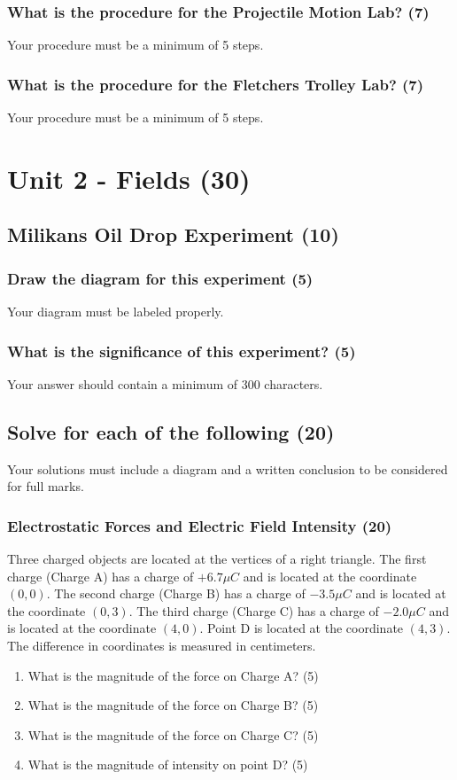 \documentclass{article}
\begin{document}
\subsubsection{What is the procedure for the Projectile Motion Lab? (7)}
Your procedure must be a minimum of 5 steps.
\subsubsection{What is the procedure for the Fletchers Trolley Lab? (7)}
Your procedure must be a minimum of 5 steps.\\

\section{Unit 2 - Fields (30)}
\subsection{Milikans Oil Drop Experiment (10)}
\subsubsection{Draw the diagram for this experiment (5)}
Your diagram must be labeled properly.

\subsubsection{What is the significance of this experiment? (5)}
Your answer should contain a minimum of 300 characters.

\subsection{Solve for each of the following (20)}
Your solutions must include a diagram and a written conclusion to be considered for full marks.

\subsubsection{Electrostatic Forces and Electric Field Intensity (20)}
Three charged objects are located at the vertices of a right triangle. The first charge (Charge A) has a charge of $+6.7\mu C$ and is located at the coordinate $(0, 0)$. The second charge (Charge B) has a charge of $-3.5\mu C$ and is located at the coordinate $(0, 3)$. The third charge (Charge C) has a charge of $-2.0\mu C$ and is located at the coordinate $(4, 0)$. Point D is located at the coordinate $(4, 3)$. The difference in coordinates is measured in centimeters.
\begin{enumerate}[label=\alph*)]
    \item What is the magnitude of the force on Charge A? (5)
    \item What is the magnitude of the force on Charge B? (5)
    \item What is the magnitude of the force on Charge C? (5)
    \item What is the magnitude of intensity on point D? (5)
\end{enumerate}
\end{document}

